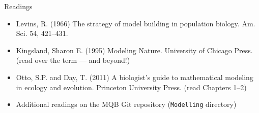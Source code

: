 \documentclass[xcolor=x11names,compress, handout]{beamer}
\renewcommand{\(}{\begin{columns}}
\renewcommand{\)}{\end{columns}}
\newcommand{\<}[1]{\begin{column}{#1}}
\renewcommand{\>}{\end{column}}
\begin{document}





	
	



\begin{frame}{Readings}

\begin{itemize}\itemsep10pt

\item Levins, R. (1966) The strategy of model building in population biology. Am. Sci. 54, 421--431.  

\item Kingsland, Sharon E. (1995) Modeling Nature. University of Chicago Press. (read over the term --- and beyond!)

\item Otto, S.P. and Day, T. (2011) A biologist's guide to mathematical modeling in ecology and evolution. Princeton University Press. (read Chapters 1--2)


\item Additional readings on the MQB Git repository ({\tt Modelling} directory)
 
\end{itemize}
\end{frame}
\end{document}
